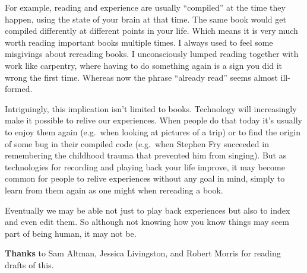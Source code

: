 For example, reading and experience are usually ``compiled'' at the time
they happen, using the state of your brain at that time. The same book
would get compiled differently at different points in your life. Which
means it is very much worth reading important books multiple times. I
always used to feel some misgivings about rereading books. I
unconsciously lumped reading together with work like carpentry, where
having to do something again is a sign you did it wrong the first time.
Whereas now the phrase ``already read'' seems almost ill-formed.

Intriguingly, this implication isn't limited to books. Technology will
increasingly make it possible to relive our experiences. When people do
that today it's usually to enjoy them again (e.g.~when looking at
pictures of a trip) or to find the origin of some bug in their compiled
code (e.g.~when Stephen Fry succeeded in remembering the childhood
trauma that prevented him from singing). But as technologies for
recording and playing back your life improve, it may become common for
people to relive experiences without any goal in mind, simply to learn
from them again as one might when rereading a book.

Eventually we may be able not just to play back experiences but also to
index and even edit them. So although not knowing how you know things
may seem part of being human, it may not be.

\textbf{Thanks} to Sam Altman, Jessica Livingston, and Robert Morris for
reading drafts of this.
